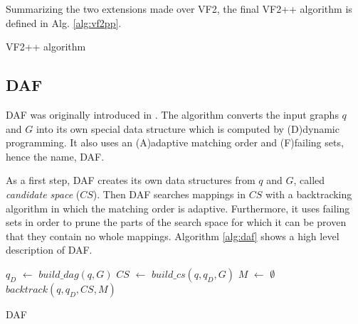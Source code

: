 Summarizing the two extensions made over VF2, the final VF2++ algorithm is defined in Alg. \ref{alg:vf2pp}.

\begin{algorithm}[h]
    \SetAlgoLined\DontPrintSemicolon
    \label{alg:vf2pp}
    \caption{VF2++ algorithm}
\end{algorithm}



\subsection{DAF}

DAF was originally introduced in . The algorithm converts the input graphs $q$ and $G$ 
into its own special data structure which is computed by (D)dynamic programming. It also uses an 
(A)adaptive matching order and (F)failing sets, hence the name, DAF.

As a first step, DAF creates its own data structures from $q$ and $G$, called \emph{candidate space} ($CS$).
Then DAF searches mappings in $CS$ with a backtracking algorithm in which the matching order is adaptive.
Furthermore, it uses failing sets in order to prune the parts of the search space for which it can be
proven that they contain no whole mappings. Algorithm \ref{alg:daf} shows a high level description of DAF.

\begin{algorithm}[h]
    \SetAlgoLined\DontPrintSemicolon
    \nl $q_D$ $\gets$ $build\_dag(q, G)$\;
    \nl $CS$ $\gets$ $build\_cs(q, q_D, G)$\;
    \nl $M$ $\gets$ $\emptyset$\;
    \nl $backtrack(q, q_D, CS, M)$\;
    \label{alg:daf}
    \caption{DAF}
\end{algorithm}

